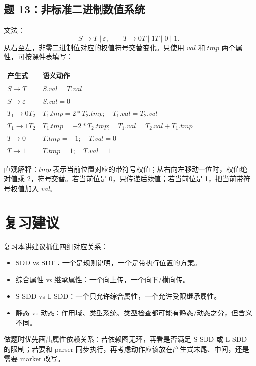\documentclass[UTF8,fontset=none,11pt]{ctexart}
\newcommand{\eps}{\varepsilon}
\begin{document}
\subsection*{题 13：非标准二进制数值系统}

文法：
\[
S\to T\mid\eps,\qquad T\to 0T\mid 1T\mid 0\mid 1.
\]
从右至左，非零二进制位对应的权值符号交替变化。只使用 \(val\) 和 \(tmp\) 两个属性，可按课件表填写：

\begin{center}
\small
\begin{tabular}{ll}
\toprule
产生式 & 语义动作 \\
\midrule
\(S\to T\) & \(S.val=T.val\) \\
\(S\to\eps\) & \(S.val=0\) \\
\(T_1\to 0T_2\) & \(T_1.tmp=2*T_2.tmp;\quad T_1.val=T_2.val\) \\
\(T_1\to 1T_2\) & \(T_1.tmp=-2*T_2.tmp;\quad T_1.val=T_2.val+T_1.tmp\) \\
\(T\to 0\) & \(T.tmp=-1;\quad T.val=0\) \\
\(T\to 1\) & \(T.tmp=1;\quad T.val=1\) \\
\bottomrule
\end{tabular}
\end{center}

直观解释：\(tmp\) 表示当前位置对应的带符号权值；从右向左移动一位时，权值绝对值乘 2，符号交替。若当前位是 0，只传递后续值；若当前位是 1，把当前带符号权值加入 \(val\)。

\section*{复习建议}

复习本讲建议抓住四组对应关系：

\begin{itemize}
  \item SDD vs SDT：一个是规则说明，一个是带执行位置的方案。
  \item 综合属性 vs 继承属性：一个向上传，一个向下/横向传。
  \item S-SDD vs L-SDD：一个只允许综合属性，一个允许受限继承属性。
  \item 静态 vs 动态：作用域、类型系统、类型检查都可能有静态/动态之分，但含义不同。
\end{itemize}

做题时优先画出属性依赖关系：若依赖图无环，再看是否满足 S-SDD 或 L-SDD 的限制；若要和 parser 同步执行，再考虑动作应该放在产生式末尾、中间，还是需要 marker 改写。
\end{document}
